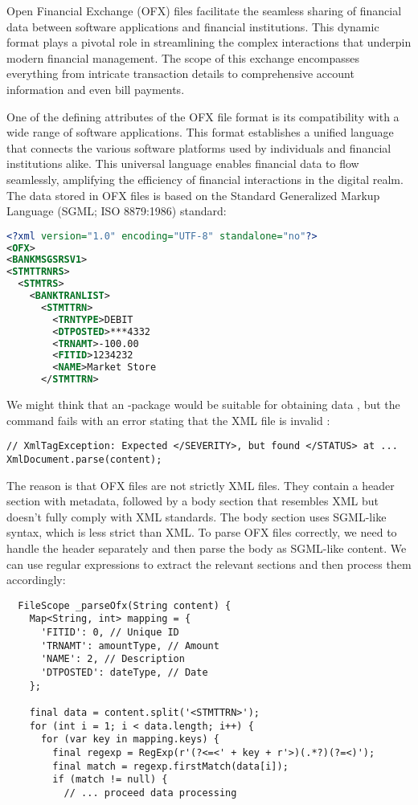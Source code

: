 Open Financial Exchange (OFX) files facilitate the seamless sharing of financial data between software applications and 
financial institutions. This dynamic format plays a pivotal role in streamlining the complex interactions that underpin 
modern financial management. The scope of this exchange encompasses everything from intricate transaction details to 
comprehensive account information and even bill payments.

One of the defining attributes of the OFX file format is its compatibility with a wide range of software applications. This format establishes a unified language that connects the various software platforms used by individuals and financial institutions alike. This universal language enables financial data to flow seamlessly, amplifying the efficiency of financial interactions in the digital realm. The data stored in OFX files is based on the Standard Generalized Markup Language (SGML; ISO 8879:1986) standard:

\begin{lstlisting}[language=xml]
<?xml version="1.0" encoding="UTF-8" standalone="no"?>
<OFX>
<BANKMSGSRSV1>
<STMTTRNRS>
  <STMTRS>
    <BANKTRANLIST>
      <STMTTRN>
        <TRNTYPE>DEBIT
        <DTPOSTED>***4332
        <TRNAMT>-100.00
        <FITID>1234232
        <NAME>Market Store
      </STMTTRN>
\end{lstlisting}

\noindent We might think that an -package would be suitable for obtaining data , but the command fails with an error stating that the XML file is invalid :

\begin{lstlisting}
// XmlTagException: Expected </SEVERITY>, but found </STATUS> at ...
XmlDocument.parse(content);
\end{lstlisting}

\noindent The reason is that OFX files are not strictly XML files. They contain a header section with metadata, followed 
by a body section that resembles XML but doesn't fully comply with XML standards. The body section uses SGML-like 
syntax, which is less strict than XML. To parse OFX files correctly, we need to handle the header separately and then 
parse the body as SGML-like content. We can use regular expressions to extract the relevant sections and then process 
them accordingly:

\begin{lstlisting}
  FileScope _parseOfx(String content) {
    Map<String, int> mapping = {
      'FITID': 0, // Unique ID
      'TRNAMT': amountType, // Amount
      'NAME': 2, // Description
      'DTPOSTED': dateType, // Date
    };

    final data = content.split('<STMTTRN>');
    for (int i = 1; i < data.length; i++) {
      for (var key in mapping.keys) {
        final regexp = RegExp(r'(?<=<' + key + r'>)(.*?)(?=<)');
        final match = regexp.firstMatch(data[i]);
        if (match != null) {
          // ... proceed data processing
\end{lstlisting}


